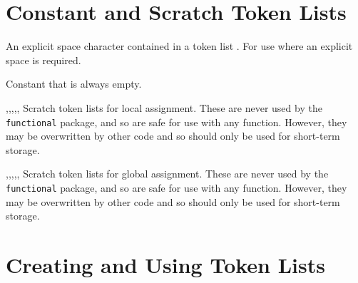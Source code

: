 \documentclass[oneside]{book}
\begin{document}
\section{Constant and Scratch Token Lists}

\begin{variable}{\cSpaceTl}
An explicit space character contained in a token list%
. For use where an explicit space is required.
\end{variable}

\begin{variable}{\cEmptyTl}
Constant that is always empty.
\end{variable}


\begin{variable}{\lTmpaTl,\lTmpbTl,\lTmpcTl,\lTmpiTl,\lTmpjTl,\lTmpkTl}
Scratch token lists for local assignment. These are never used by
the \verb!functional! package, and so are safe for use with any
function. However, they may be overwritten by other
code and so should only be used for short-term storage.
\end{variable}

\begin{variable}{\gTmpaTl,\gTmpbTl,\gTmpcTl,\gTmpiTl,\gTmpjTl,\gTmpkTl}
Scratch token lists for global assignment. These are never used by
the \verb!functional! package, and so are safe for use with any
function. However, they may be overwritten by other
code and so should only be used for short-term storage.
\end{variable}

\section{Creating and Using Token Lists}
\end{document}

